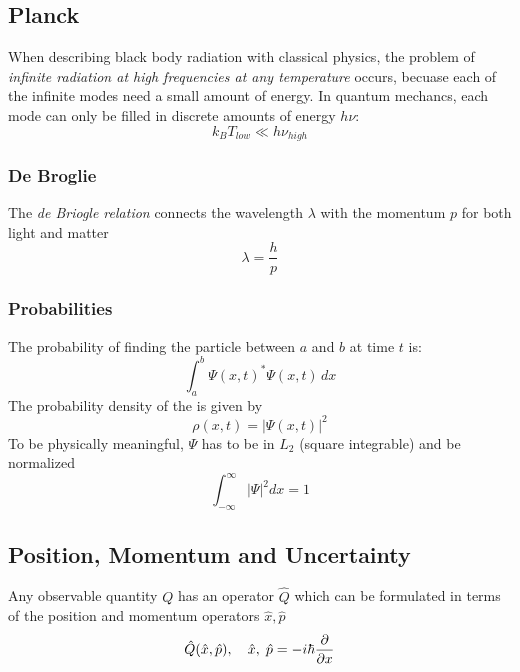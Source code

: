 \subsection{Planck}
When describing black body radiation with classical physics, the problem of \textit{infinite radiation at 
high frequencies at any temperature} occurs, becuase each of the infinite modes need a small amount of energy.
In quantum mechancs, each mode can only be filled in discrete amounts of energy $h \nu$:
\begin{equation*}
    k_B T_{low} \ll h\nu_{high}
\end{equation*}

\subsubsection{De Broglie}
The \textit{de Briogle relation} connects the wavelength $\lambda$ with the momentum $p$ for both light and matter
\begin{equation*}
    \lambda = \frac{h}{p}
\end{equation*}

\subsubsection{Probabilities}
The probability of finding the particle between $a$ and $b$ at time $t$ is:
\begin{equation*}
    \int_a^b {\Psi(x,t)}^*\Psi(x,t)\,dx
\end{equation*}
The probability density of the is given by
\begin{equation*}
    \rho(x,t) = |\Psi(x,t)|^2
\end{equation*}
To be physically meaningful, $\Psi$ has to be in $L_2$ (square integrable) and be normalized
\begin{equation*}
    \int_{-\infty}^{\infty} |\Psi|^2 dx = 1
\end{equation*}

\subsection{Position, Momentum and Uncertainty}
Any observable quantity $Q$ has an operator $\hat{Q}$ which can be formulated in terms of the position and momentum operators $\hat{x}, \hat{p}$
\begin{equation*}
    \hat{Q}(\hat{x},\hat{p}), \hspace*{10pt} \hat{x},\; \hat{p}=-i\hbar \frac{\partial}{\partial x}
\end{equation*}

